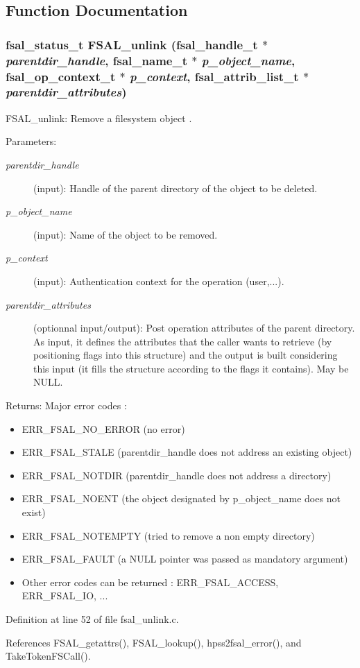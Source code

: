 \subsection{Function Documentation}
\subsubsection{\setlength{\rightskip}{0pt plus 5cm}fsal\_\-status\_\-t FSAL\_\-unlink (fsal\_\-handle\_\-t $\ast$ {\em parentdir\_\-handle}, fsal\_\-name\_\-t $\ast$ {\em p\_\-object\_\-name}, fsal\_\-op\_\-context\_\-t $\ast$ {\em p\_\-context}, fsal\_\-attrib\_\-list\_\-t $\ast$ {\em parentdir\_\-attributes})}\label{fsal__unlink_8c_a0}


FSAL\_\-unlink: Remove a filesystem object .

\begin{Desc}
\item[Parameters:]
\begin{description}
\item[{\em parentdir\_\-handle}](input): Handle of the parent directory of the object to be deleted. \item[{\em p\_\-object\_\-name}](input): Name of the object to be removed. \item[{\em p\_\-context}](input): Authentication context for the operation (user,...). \item[{\em parentdir\_\-attributes}](optionnal input/output): Post operation attributes of the parent directory. As input, it defines the attributes that the caller wants to retrieve (by positioning flags into this structure) and the output is built considering this input (it fills the structure according to the flags it contains). May be NULL.\end{description}
\end{Desc}
\begin{Desc}
\item[Returns:]Major error codes :\begin{itemize}
\item ERR\_\-FSAL\_\-NO\_\-ERROR (no error)\item ERR\_\-FSAL\_\-STALE (parentdir\_\-handle does not address an existing object)\item ERR\_\-FSAL\_\-NOTDIR (parentdir\_\-handle does not address a directory)\item ERR\_\-FSAL\_\-NOENT (the object designated by p\_\-object\_\-name does not exist)\item ERR\_\-FSAL\_\-NOTEMPTY (tried to remove a non empty directory)\item ERR\_\-FSAL\_\-FAULT (a NULL pointer was passed as mandatory argument)\item Other error codes can be returned : ERR\_\-FSAL\_\-ACCESS, ERR\_\-FSAL\_\-IO, ... \end{itemize}
\end{Desc}


Definition at line 52 of file fsal\_\-unlink.c.

References FSAL\_\-getattrs(), FSAL\_\-lookup(), hpss2fsal\_\-error(), and Take\-Token\-FSCall().